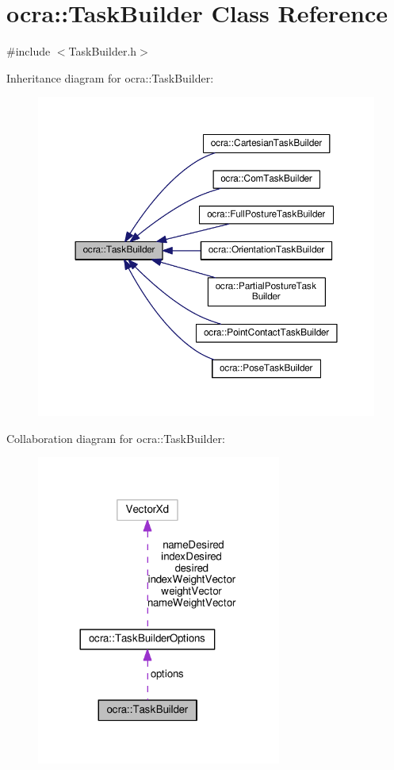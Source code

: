 \hypertarget{classocra_1_1TaskBuilder}{}\section{ocra\+:\+:Task\+Builder Class Reference}
\label{classocra_1_1TaskBuilder}


{\ttfamily \#include $<$Task\+Builder.\+h$>$}



Inheritance diagram for ocra\+:\+:Task\+Builder\+:
\nopagebreak
\begin{figure}[H]
\begin{center}
\leavevmode
\includegraphics[width=350pt]{df/dc8/classocra_1_1TaskBuilder__inherit__graph}
\end{center}
\end{figure}


Collaboration diagram for ocra\+:\+:Task\+Builder\+:
\nopagebreak
\begin{figure}[H]
\begin{center}
\leavevmode
\includegraphics[width=228pt]{df/d45/classocra_1_1TaskBuilder__coll__graph}
\end{center}
\end{figure}
